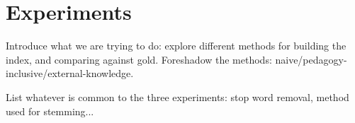 \section{Experiments}
\label{sec:exp}

Introduce what we are trying to do: explore different methods for
building the index, and comparing against gold. Foreshadow the
methods: naive/pedagogy-inclusive/external-knowledge.

List whatever is common to the three experiments: stop word removal,
method used for stemming...

